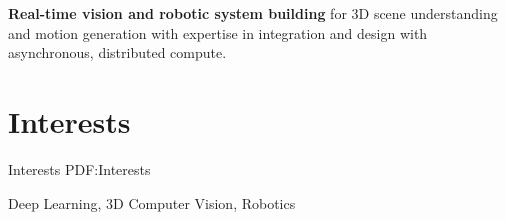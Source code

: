 \documentclass[letterpaper,MMMyyyy,nonstop]{simpleresumecv}
\newcommand{\CVNote}{CV compiled on {\today}}
\begin{document}
\begin{body}
\BulletItem
\textbf{Real-time vision and robotic system building} for 3D scene understanding and motion generation with expertise in integration and design with asynchronous, distributed compute.

%
%

\BigGapNoBreak

\section
{Interests}
{Interests}
{PDF:Interests}

Deep Learning,
3D Computer Vision,
Robotics

\end{body}


\end{document}

